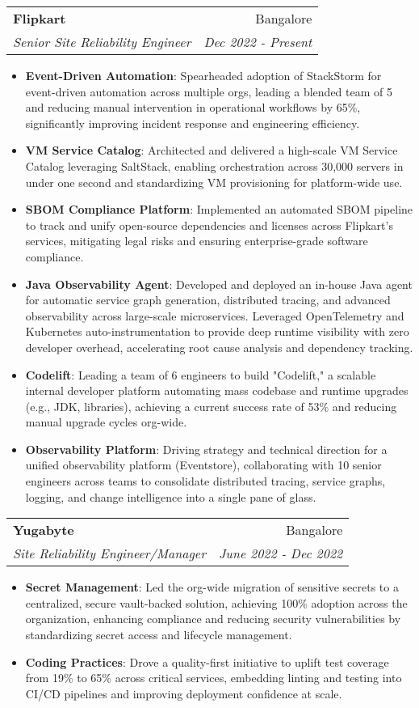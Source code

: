 \documentclass[letterpaper,11pt]{article}
\makeatletter
\newcommand{\resumeItem}[2]{
  \item\small{
    \textbf{#1}{: #2 \vspace{-2pt}}
  }
}
\newcommand{\resumeSubheading}[4]{
  \vspace{-1pt}\item
    \begin{tabular*}{0.97\textwidth}{l@{\extracolsep{\fill}}r}
      \textbf{#1} & #2 \\
      \textit{\small#3} & \textit{\small #4} \\
    \end{tabular*}\vspace{-5pt}
}
\newcommand{\resumeItemListStart}{\begin{itemize}}
\newcommand{\resumeItemListEnd}{\end{itemize}\vspace{-5pt}}
\makeatother
\begin{document}
    \resumeSubheading
      {Flipkart}{Bangalore}
      {Senior Site Reliability Engineer}{Dec 2022 - Present}
      \resumeItemListStart
        \resumeItem{Event-Driven Automation}
          {Spearheaded adoption of StackStorm for event-driven automation across multiple orgs, leading a blended team of 5 and reducing manual intervention in operational workflows by 65\%, significantly improving incident response and engineering efficiency.}
        \resumeItem{VM Service Catalog}
          {Architected and delivered a high-scale VM Service Catalog leveraging SaltStack, enabling orchestration across 30,000 servers in under one second and standardizing VM provisioning for platform-wide use.}
        \resumeItem{SBOM Compliance Platform}
          {Implemented an automated SBOM pipeline to track and unify open-source dependencies and licenses across Flipkart’s services, mitigating legal risks and ensuring enterprise-grade software compliance.}
        \resumeItem{Java Observability Agent}
          {Developed and deployed an in-house Java agent for automatic service graph generation, distributed tracing, and advanced observability across large-scale microservices. Leveraged OpenTelemetry and Kubernetes auto-instrumentation to provide deep runtime visibility with zero developer overhead, accelerating root cause analysis and dependency tracking.}
        \resumeItem{Codelift}
          {Leading a team of 6 engineers to build "Codelift," a scalable internal developer platform automating mass codebase and runtime upgrades (e.g., JDK, libraries), achieving a current success rate of 53\% and reducing manual upgrade cycles org-wide.}
        \resumeItem{Observability Platform}
          {Driving strategy and technical direction for a unified observability platform (Eventstore), collaborating with 10 senior engineers across teams to consolidate distributed tracing, service graphs, logging, and change intelligence into a single pane of glass.}
      \resumeItemListEnd

    \resumeSubheading
      {Yugabyte}{Bangalore}
      {Site Reliability Engineer/Manager}{June 2022 - Dec 2022}
      \resumeItemListStart
        \resumeItem{Secret Management}
          {Led the org-wide migration of sensitive secrets to a centralized, secure vault-backed solution, achieving 100\% adoption across the organization, enhancing compliance and reducing security vulnerabilities by standardizing secret access and lifecycle management.}
        \resumeItem{Coding Practices}
          {Drove a quality-first initiative to uplift test coverage from 19\% to 65\% across critical services, embedding linting and testing into CI/CD pipelines and improving deployment confidence at scale.}
      \resumeItemListEnd
\end{document}
